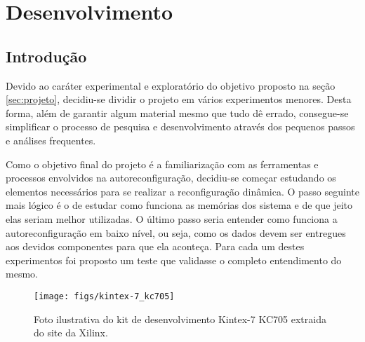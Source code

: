 \documentclass[11pt,a4paper,oneside]{book}
\begin{document}
	\frontmatter
	\listoftodos
	\mainmatter
	
\fi
\newcommand\dlq{\lq\lq{}}
\newcommand\drq{\rq\rq{}}

                      
\chapter{Desenvolvimento}\label{CapDesenvolvimento}


\section{Introdu\c{c}\~{a}o}
Devido ao caráter experimental e exploratório do objetivo proposto na seção \ref{sec:projeto}, decidiu-se dividir o projeto em vários experimentos menores.
Desta forma, além de garantir algum material mesmo que tudo dê errado, consegue-se simplificar o processo de pesquisa e desenvolvimento através dos pequenos passos e análises frequentes.

Como o objetivo final do projeto é a familiarização com as ferramentas e processos envolvidos na autoreconfiguração, decidiu-se começar estudando os elementos necessários para se realizar a reconfiguração dinâmica.
O passo seguinte mais lógico é o de estudar como funciona as memórias dos sistema e de que jeito elas seriam melhor utilizadas.
O último passo seria entender como funciona a autoreconfiguração em baixo nível, ou seja, como os dados devem ser entregues aos devidos componentes para que ela aconteça.
Para cada um destes experimentos foi proposto um teste que validasse o completo entendimento do mesmo.

\begin{figure}[h]
\centering
\texttt{[image: figs/kintex-7\_kc705]}
\caption{Foto ilustrativa do kit de desenvolvimento Kintex-7 KC705 extraida do site da Xilinx.}
\label{fig:kc705}
\end{figure}
\end{document}
